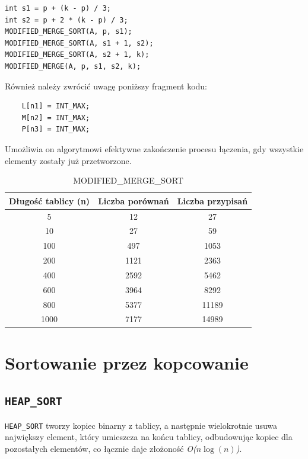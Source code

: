\documentclass{article}
\begin{document}
\begin{lstlisting}
int s1 = p + (k - p) / 3;
int s2 = p + 2 * (k - p) / 3; 
MODIFIED_MERGE_SORT(A, p, s1);
MODIFIED_MERGE_SORT(A, s1 + 1, s2);
MODIFIED_MERGE_SORT(A, s2 + 1, k);
MODIFIED_MERGE(A, p, s1, s2, k);
\end{lstlisting}
Również należy zwrócić uwagę poniższy fragment kodu:
\begin{lstlisting}
	L[n1] = INT_MAX;
	M[n2] = INT_MAX;
	P[n3] = INT_MAX;
\end{lstlisting}
Umożliwia on algorytmowi efektywne zakończenie procesu łączenia, gdy wszystkie elementy zostały już przetworzone.
\begin{table}[h!]
	\centering
	\small
	\begin{tabular}{|c|c|c|}
		\hline
		\textbf{Długość tablicy (n)} & \textbf{Liczba porównań} & \textbf{Liczba przypisań} \\ \hline
		5   & 12    & 27     \\ \hline
		10  & 27    & 59     \\ \hline
		100 & 497   & 1053   \\ \hline
		200 & 1121  & 2363   \\ \hline
		400 & 2592  & 5462   \\ \hline
		600 & 3964  & 8292   \\ \hline
		800 & 5377  & 11189  \\ \hline
		1000 & 7177  & 14989  \\ \hline
	\end{tabular}
	\caption{MODIFIED\_MERGE\_SORT}
\end{table}



\section{Sortowanie przez kopcowanie}

\subsection{\texttt{HEAP\_SORT}}
\texttt{HEAP\_SORT} tworzy kopiec binarny z tablicy, a następnie wielokrotnie usuwa największy element, który umieszcza na końcu tablicy, odbudowując kopiec dla pozostałych elementów, co łącznie daje złożoność \emph{O($n \log(n)$)}.
\end{document}
